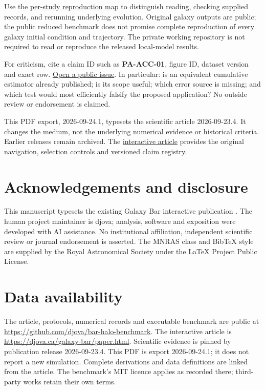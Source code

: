 \documentclass[fleqn,usenatbib]{mnras}
\begin{document}
Use the \href{https://djova.ca/galaxy-bar/reproduce.html}{per-study reproduction map} to distinguish reading, checking supplied records, and rerunning underlying evolution. Original galaxy outputs are public; the public reduced benchmark does not promise complete reproduction of every galaxy initial condition and trajectory. The private working repository is not required to read or reproduce the released local-model results.

For criticism, cite a claim ID such as \textbf{PA-ACC-01}, figure ID, dataset version and exact row. \href{https://github.com/djova/bar-halo-benchmark/issues}{Open a public issue}. In particular: is an equivalent cumulative estimator already published; is its scope useful; which error source is missing; and which test would most efficiently falsify the proposed application? No outside review or endorsement is claimed.

This PDF export, 2026-09-24.1, typesets the scientific article 2026-09-23.4. It changes the medium, not the underlying numerical evidence or historical criteria. Earlier releases remain archived. The \href{https://djova.ca/galaxy-bar/paper.html}{interactive article} provides the original navigation, selection controls and versioned claim registry.

\section*{Acknowledgements and disclosure}
This manuscript typesets the existing Galaxy Bar interactive publication \citep{GalaxyBar2026}. The human project maintainer is djova; analysis, software and exposition were developed with AI assistance. No institutional affiliation, independent scientific review or journal endorsement is asserted. The MNRAS class and BibTeX style are supplied by the Royal Astronomical Society under the LaTeX Project Public License.
\section*{Data availability}
The article, protocols, numerical records and executable benchmark are public at \url{https://github.com/djova/bar-halo-benchmark}. The interactive article is \url{https://djova.ca/galaxy-bar/paper.html}. Scientific evidence is pinned by publication release 2026-09-23.4. This PDF is export 2026-09-24.1; it does not report a new simulation. Complete derivations and data definitions are linked from the article. The benchmark's MIT licence applies as recorded there; third-party works retain their own terms.


\clearpage
\onecolumn
\makeatletter
\def\fps@table{!h}
\makeatother
\appendix
\renewcommand{\theHtable}{\thesection.\arabic{table}}
\end{document}
